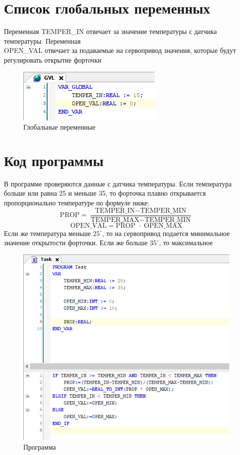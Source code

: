 \documentclass[a4paper, 16pt]{article}
\begin{document}
    \section{Список глобальных переменных}
    \noindent Переменная TEMPER\_{IN} отвечает за значение температуры с датчика температуры.
    Переменная\\OPEN\_{VAL} отвечает за подаваемые на сервопривод значения, которые будут регулировать открытие форточки\\
    \begin{figure}[!h]
        \centering
        \includegraphics[scale=1]{gvl.png}
        \captionsetup{skip=0pt}
        \caption{Глобальные переменные}
        \label{Рис:3}
    \end{figure}


    \section{Код программы}
    \noindent В программе проверяются данные с датчика температуры. Если температура больше или равна 25 и
    меньше 35, то форточка плавно открывается пропорционально температуре по формуле ниже:
    $$
    \text{PROP} = \frac{\text{TEMPER\_IN} - \text{TEMPER\_MIN}}{\text{TEMPER\_MAX} - \text{TEMPER\_MIN}}
    $$
    $$
    \text{OPEN\_VAL}=\text{PROP } \cdot \text{ OPEN\_MAX}
    $$
    \noindent Если же температура меньше $25^{\circ}$, то на сервопривод подается минимальное
    значение открытости форточки. Если же больше $35^{\circ}$, то максимальное
    \begin{figure}[!h]
        \centering
        \includegraphics[scale=0.9]{prog.png}
        \captionsetup{skip=0pt}
        \caption{Программа}
        \label{Рис:4}
    \end{figure}
\end{document}
